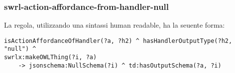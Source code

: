 \subsubsection{swrl-action-affordance-from-handler-null}
La regola, utilizzando una sintassi human readable, ha la seuente forma:
\begin{verbatim}
isActionAffordanceOfHandler(?a, ?h2) ^ hasHandlerOutputType(?h2, "null") ^
swrlx:makeOWLThing(?i, ?a)
	-> jsonschema:NullSchema(?i) ^ td:hasOutputSchema(?a, ?i)
\end{verbatim}
